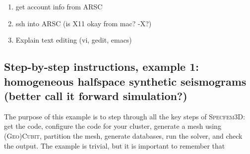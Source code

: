 \documentclass[10pt,fleqn,letterpaper]{article}
\newcommand{\specfem}{\textsc{Specfem3D}}
\newcommand{\cubit}{\textsc{Cubit}}
\begin{document}
\begin{enumerate}
\item get account info from ARSC
\item ssh into ARSC (is X11 okay from mac? -X?)
\item Explain text editing (vi, gedit, emacs)
\end{enumerate}


\subsection*{Step-by-step instructions, example 1: homogeneous halfspace synthetic seismograms (better call it forward simulation?)}

The purpose of this example is to step through all the key steps of \specfem: get the code, configure the code for your cluster, generate a mesh using (\textsc{Geo})\cubit, partition the mesh, generate databases, run the solver, and check the output. The example is trivial, but it is important to remember that 
\end{document}
